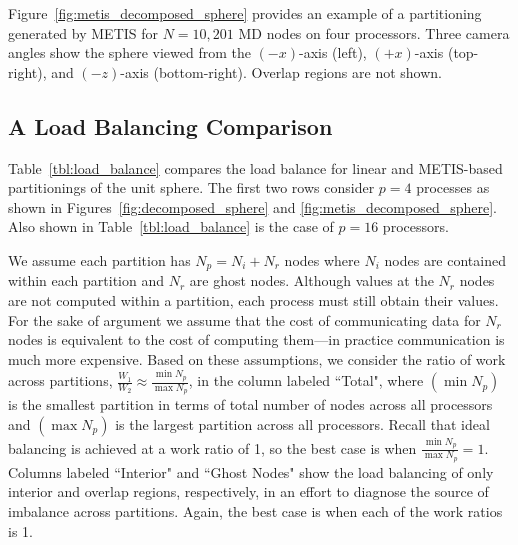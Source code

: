\documentclass{report}
\begin{document}
Figure~\ref{fig:metis_decomposed_sphere} provides an example of a partitioning generated by METIS for $N=10,201$ MD nodes on four processors. Three camera angles show the sphere viewed from the $(-x)$-axis (left), $(+x)$-axis (top-right), and $(-z)$-axis (bottom-right). Overlap regions are not shown.

\subsection{A Load Balancing Comparison}
\label{sec:load_balance}

Table~\ref{tbl:load_balance} compares the load balance for linear and METIS-based partitionings of the unit sphere. The first two rows consider $p=4$ processes as shown in Figures~\ref{fig:decomposed_sphere} and \ref{fig:metis_decomposed_sphere}. Also shown in Table~\ref{tbl:load_balance} is the case of $p=16$ processors. 

We assume each partition has $N_p = N_i + N_r$ nodes where $N_i$ nodes are contained within each partition and $N_r$ are ghost nodes. Although values at the $N_r$ nodes are not computed within a partition, each process must still obtain their values. For the sake of argument we assume that the cost of communicating data for $N_r$ nodes is equivalent to the cost of computing them---in practice communication is much more expensive. Based on these assumptions, we consider the ratio of work across partitions, $\frac{W_1}{W_2} \approx \frac{\min N_p}{\max N_p}$, in the column labeled ``Total", where $(\min N_p)$ is the smallest partition in terms of total number of nodes across all processors and $(\max N_p)$ is the largest partition across all processors. Recall that ideal balancing is achieved at a work ratio of 1, so the best case is when $\frac{\min N_p}{\max N_p} = 1$. Columns labeled ``Interior" and ``Ghost Nodes" show the load balancing of only interior and overlap regions, respectively, in an effort to diagnose the source of imbalance across partitions. Again, the best case is when each of the work ratios is 1.
\end{document}
